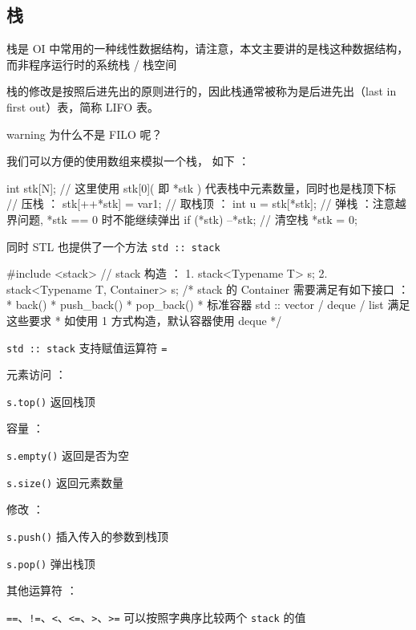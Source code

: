 
\subsection{栈}

栈是 OI 中常用的一种线性数据结构，请注意，本文主要讲的是栈这种数据结构， 而非程序运行时的系统栈 / 栈空间

栈的修改是按照后进先出的原则进行的，因此栈通常被称为是后进先出（last in first out）表，简称 LIFO 表。

\begin{NOTE}{warning}{}
为什么不是 FILO 呢？
\end{NOTE}


我们可以方便的使用数组来模拟一个栈， 如下 ：

\begin{cppcode}
int stk[N];
// 这里使用 stk[0]( 即 *stk ) 代表栈中元素数量，同时也是栈顶下标
// 压栈 ：
stk[++*stk] = var1;
// 取栈顶 ：
int u = stk[*stk];
// 弹栈 ：注意越界问题, *stk == 0 时不能继续弹出
if (*stk) --*stk;
// 清空栈
*stk = 0;
\end{cppcode}

同时 STL 也提供了一个方法 \texttt{std :: stack}

\begin{cppcode}
#include <stack>
// stack 构造 ：
1. stack<Typename T> s;
2. stack<Typename T, Container> s;
/* stack 的 Container 需要满足有如下接口 ：
 * back()
 * push_back()
 * pop_back()
 * 标准容器 std :: vector / deque / list 满足这些要求
 * 如使用 1 方式构造，默认容器使用 deque
 */
\end{cppcode}

\texttt{std :: stack} 支持赋值运算符 \texttt{=}

元素访问 ：

\texttt{s.top()} 返回栈顶

容量 ：

\texttt{s.empty()} 返回是否为空

\texttt{s.size()} 返回元素数量

修改 ：

\texttt{s.push()} 插入传入的参数到栈顶

\texttt{s.pop()} 弹出栈顶

其他运算符 ：

\texttt{==}、\texttt{!=}、\texttt{<}、\texttt{<=}、\texttt{>}、\texttt{>=} 可以按照字典序比较两个 \texttt{stack} 的值

